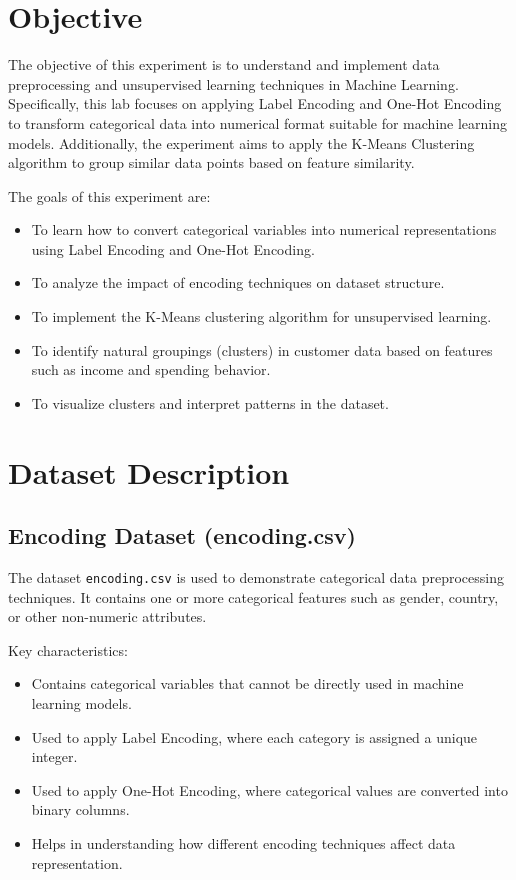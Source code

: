 \documentclass[11pt]{article}
\begin{document}
    
\tableofcontents
\thispagestyle{empty}
\clearpage
{}
    

\section{Objective}
The objective of this experiment is to understand and implement data preprocessing and unsupervised learning techniques in Machine Learning. Specifically, this lab focuses on applying Label Encoding and One-Hot Encoding to transform categorical data into numerical format suitable for machine learning models. Additionally, the experiment aims to apply the K-Means Clustering algorithm to group similar data points based on feature similarity.

The goals of this experiment are:
\begin{itemize}
    \item To learn how to convert categorical variables into numerical representations using Label Encoding and One-Hot Encoding.
    \item To analyze the impact of encoding techniques on dataset structure.
    \item To implement the K-Means clustering algorithm for unsupervised learning.
    \item To identify natural groupings (clusters) in customer data based on features such as income and spending behavior.
    \item To visualize clusters and interpret patterns in the dataset.
\end{itemize}

\section{Dataset Description}

\subsection*{Encoding Dataset (encoding.csv)}
The dataset \texttt{encoding.csv} is used to demonstrate categorical data preprocessing techniques. It contains one or more categorical features such as gender, country, or other non-numeric attributes.

Key characteristics:
\begin{itemize}
    \item Contains categorical variables that cannot be directly used in machine learning models.
    \item Used to apply Label Encoding, where each category is assigned a unique integer.
    \item Used to apply One-Hot Encoding, where categorical values are converted into binary columns.
    \item Helps in understanding how different encoding techniques affect data representation.
\end{itemize}
\end{document}
